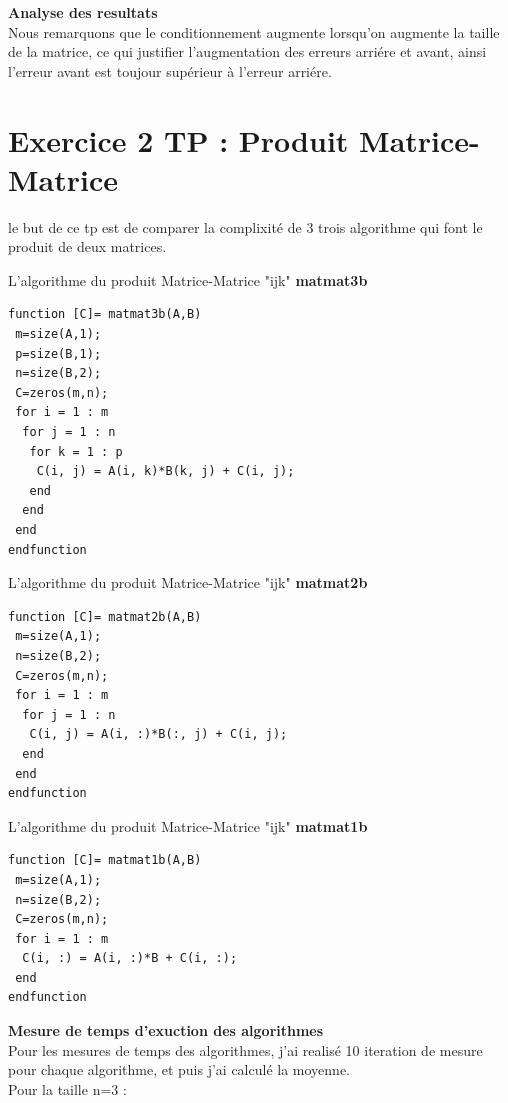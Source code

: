 \documentclass[12pt]{report}
\begin{document}
\textbf{Analyse des resultats}\\
Nous remarquons que le conditionnement augmente lorsqu'on augmente la taille de la matrice, ce qui justifier l'augmentation des erreurs arriére et avant, ainsi l'erreur avant est toujour supérieur à l'erreur arriére. 
      
\section{Exercice 2 TP : Produit Matrice-Matrice} 
le but de ce tp est de comparer la complixité de 3 trois algorithme qui font le produit de deux matrices.
         
L’algorithme du produit Matrice-Matrice "ijk" \textbf{matmat3b}
\begin{lstlisting}
function [C]= matmat3b(A,B)
 m=size(A,1);
 p=size(B,1);
 n=size(B,2);
 C=zeros(m,n);
 for i = 1 : m
  for j = 1 : n
   for k = 1 : p
    C(i, j) = A(i, k)*B(k, j) + C(i, j);
   end 
  end 
 end 
endfunction
\end{lstlisting}     

L’algorithme du produit Matrice-Matrice "ijk" \textbf{matmat2b}
\begin{lstlisting} 
function [C]= matmat2b(A,B)
 m=size(A,1);
 n=size(B,2);
 C=zeros(m,n);
 for i = 1 : m
  for j = 1 : n
   C(i, j) = A(i, :)*B(:, j) + C(i, j);
  end 
 end 
endfunction 
\end{lstlisting} 
 
L’algorithme du produit Matrice-Matrice "ijk" \textbf{matmat1b}
\begin{lstlisting} 
function [C]= matmat1b(A,B)
 m=size(A,1);
 n=size(B,2);
 C=zeros(m,n);
 for i = 1 : m
  C(i, :) = A(i, :)*B + C(i, :);
 end 
endfunction
\end{lstlisting}  

\textbf{Mesure de temps d'exuction des algorithmes}\\

Pour les mesures de temps des algorithmes, j'ai realisé 10 iteration de mesure pour chaque algorithme, et puis j'ai calculé la moyenne.\\

Pour la taille n=3 :\\
\end{document}

